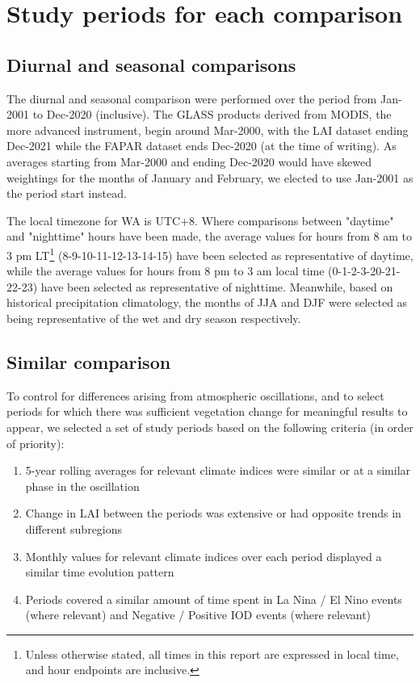 \section{Study periods for each comparison}

\subsection{Diurnal and seasonal comparisons}
\label{ssec:method_diurnal_seasonal}

The diurnal and seasonal comparison were performed over the period from Jan-2001 to Dec-2020 (inclusive). The GLASS products derived from \ac{MODIS}, the more advanced instrument, begin around Mar-2000, with the \ac{LAI} dataset ending Dec-2021 while the \ac{FAPAR} dataset ends Dec-2020 (at the time of writing). As averages starting from Mar-2000 and ending Dec-2020 would have skewed weightings for the months of January and February, we elected to use Jan-2001 as the period start instead.

The local timezone for \ac{WA} is UTC+8. Where comparisons between "daytime" and "nighttime" hours have been made, the average values for hours from 8 am to 3 pm \ac{LT}\footnote{Unless otherwise stated, all times in this report are expressed in local time, and hour endpoints are inclusive.} (8-9-10-11-12-13-14-15) have been selected as representative of daytime, while the average values for hours from 8 pm to 3 am local time (0-1-2-3-20-21-22-23) have been selected as representative of nighttime. Meanwhile, based on historical precipitation climatology, the months of \ac{JJA} and \ac{DJF} were selected as being representative of the wet and dry season respectively.

\subsection{Similar comparison}

To control for differences arising from atmospheric oscillations, and to select periods for which there was sufficient vegetation change for meaningful results to appear, we selected a set of study periods based on the following criteria (in order of priority):
\begin{enumerate}
	\item 5-year rolling averages for relevant climate indices were similar or at a similar phase in the oscillation
	\item Change in \ac{LAI} between the periods was extensive or had opposite trends in different subregions
	\item Monthly values for relevant climate indices over each period displayed a similar time evolution pattern
	\item Periods covered a similar amount of time spent in La Nina / El Nino events (where relevant) and Negative / Positive \ac{IOD} events (where relevant)
\end{enumerate}

